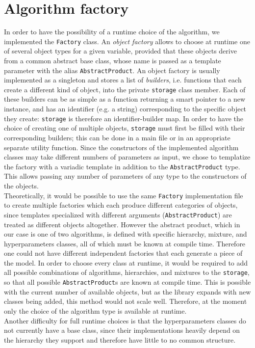 \section{Algorithm factory}
In order to have the possibility of a runtime choice of the algorithm, we implemented the \verb|Factory| class.
An \emph{object factory} allows to choose at runtime one of several object types for a given variable, provided that these objects derive from a common abstract base class, whose name is passed as a template parameter with the alias \verb|AbstractProduct|.
An object factory is usually implemented as a singleton and stores a list of \emph{builders}, i.e. functions that each create a different kind of object, into the private \verb|storage| class member.
Each of these builders can be as simple as a function returning a smart pointer to a new instance, and has an identifier (e.g. a string) corresponding to the specific object they create: \verb|storage| is therefore an identifier-builder map.
In order to have the choice of creating one of multiple objects, \verb|storage| must first be filled with their corresponding builders; this can be done in a main file or in an appropriate separate utility function.
Since the constructors of the implemented algorithm classes may take different numbers of parameters as input, we chose to templatize the factory with a variadic template in addition to the \verb|AbstractProduct| type.
This allows passing any number of parameters of any type to the constructors of the objects. \\
Theoretically, it would be possible to use the same \verb|Factory| implementation file to create multiple factories which each produce different categories of objects, since templates specialized with different arguments (\verb|AbstractProduct|) are treated as different objects altogether.
However the abstract product, which in our case is one of two algorithms, is defined with specific hierarchy, mixture, and hyperparameters classes, all of which must be known at compile time.
Therefore one could not have different independent factories that each generate a piece of the model.
In order to choose every class at runtime, it would be required to add all possible combinations of algorithms, hierarchies, and mixtures to the \verb|storage|, so that all possible \verb|AbstractProduct|s are known at compile time.
This is possible with the current number of available objects, but as the library expands with new classes being added, this method would not scale well.
Therefore, at the moment only the choice of the algorithm type is available at runtime. \\
Another difficulty for full runtime choices is that the hyperparameters classes do not currently have a base class, since their implementations heavily depend on the hierarchy they support and therefore have little to no common structure.
